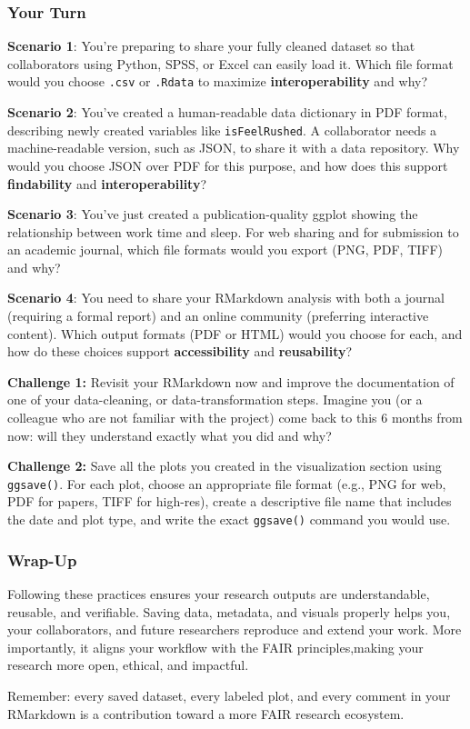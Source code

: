 \documentclass[
]{article}
\begin{document}
\subsubsection{Your Turn}\label{your-turn}

\textbf{Scenario 1}: You're preparing to share your fully cleaned
dataset so that collaborators using Python, SPSS, or Excel can easily
load it. Which file format would you choose \texttt{.csv} or
\texttt{.Rdata} to maximize \textbf{interoperability} and why?

\textbf{Scenario 2}: You've created a human-readable data dictionary in
PDF format, describing newly created variables like
\texttt{isFeelRushed}. A collaborator needs a machine-readable version,
such as JSON, to share it with a data repository. Why would you choose
JSON over PDF for this purpose, and how does this support
\textbf{findability} and \textbf{interoperability}?

\textbf{Scenario 3}: You've just created a publication-quality ggplot
showing the relationship between work time and sleep. For web sharing
and for submission to an academic journal, which file formats would you
export (PNG, PDF, TIFF) and why?

\textbf{Scenario 4}: You need to share your RMarkdown analysis with both
a journal (requiring a formal report) and an online community
(preferring interactive content). Which output formats (PDF or HTML)
would you choose for each, and how do these choices support
\textbf{accessibility} and \textbf{reusability}?

\textbf{Challenge 1:} Revisit your RMarkdown now and improve the
documentation of one of your data-cleaning, or data-transformation
steps. Imagine you (or a colleague who are not familiar with the
project) come back to this 6 months from now: will they understand
exactly what you did and why?

\textbf{Challenge 2:} Save all the plots you created in the
visualization section using \texttt{ggsave()}. For each plot, choose an
appropriate file format (e.g., PNG for web, PDF for papers, TIFF for
high-res), create a descriptive file name that includes the date and
plot type, and write the exact \texttt{ggsave()} command you would use.

\subsubsection{Wrap-Up}\label{wrap-up}

Following these practices ensures your research outputs are
understandable, reusable, and verifiable. Saving data, metadata, and
visuals properly helps you, your collaborators, and future researchers
reproduce and extend your work. More importantly, it aligns your
workflow with the FAIR principles,making your research more open,
ethical, and impactful.

Remember: every saved dataset, every labeled plot, and every comment in
your RMarkdown is a contribution toward a more FAIR research ecosystem.
\end{document}
